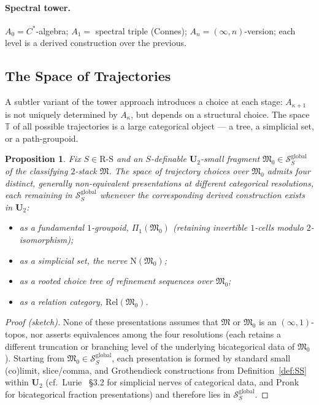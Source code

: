 \documentclass[11pt]{article}
\theoremstyle{plain}
\newtheorem{proposition}[theorem]{Proposition}
\theoremstyle{definition}
\newcommand{\RS}{\mathrm{R\text{-}S}}
\newcommand{\cS}{\mathcal{S}}
\newcommand{\fM}{\mathfrak{M}}
\begin{document}
\paragraph{Spectral tower.} $A_0 = C^*$-algebra; $A_1 = $ spectral triple (Connes); $A_n = (\infty, n)$-version; each level is a derived construction over the previous.

\subsection{The Space of Trajectories}

A subtler variant of the tower approach introduces a choice at each stage: $A_{\kappa+1}$ is not uniquely determined by $A_\kappa$, but depends on a structural choice. The space $\mathbb{T}$ of all possible trajectories is a large categorical object --- a tree, a simplicial set, or a path-groupoid.

\begin{proposition}\label{prop:trajectory-space}
Fix $S \in \RS$ and an $S$-definable $\mathbf{U}_2$-small fragment $\fM_0 \in \cS_S^{\mathrm{global}}$ of the classifying $2$-stack $\fM$. The space of trajectory choices over $\fM_0$ admits four distinct, generally non-equivalent presentations at different categorical resolutions, each remaining in $\cS_S^{\mathrm{global}}$ whenever the corresponding derived construction exists in $\mathbf{U}_2$:
\begin{itemize}
\item as a fundamental $1$-groupoid, $\Pi_1(\fM_0)$ (retaining invertible $1$-cells modulo $2$-isomorphism);
\item as a simplicial set, the nerve $\mathrm{N}(\fM_0)$;
\item as a rooted choice tree of refinement sequences over $\fM_0$;
\item as a relation category, $\mathrm{Rel}(\fM_0)$.
\end{itemize}
\end{proposition}

\begin{proof}[Proof (sketch)]
None of these presentations assumes that $\fM$ or $\fM_0$ is an $(\infty, 1)$-topos, nor asserts equivalences among the four resolutions (each retains a different truncation or branching level of the underlying bicategorical data of $\fM_0$). Starting from $\fM_0 \in \cS_S^{\mathrm{global}}$, each presentation is formed by standard small (co)limit, slice/comma, and Grothendieck constructions from Definition~\ref{def:SS} within $\mathbf{U}_2$ (cf.\ Lurie~\cite{LurieHTT} \S 3.2 for simplicial nerves of categorical data, and Pronk~\cite{Pronk1996} for bicategorical fraction presentations) and therefore lies in $\cS_S^{\mathrm{global}}$.
\end{proof}
\end{document}
